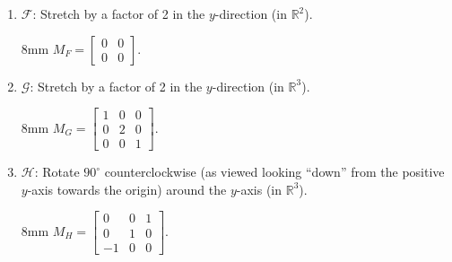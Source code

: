 \documentclass[letter]{article}
\newcommand{\R}{\mathbb{R}}
\newcommand{\mat}[1]{\begin{bmatrix}#1\end{bmatrix}}
\newenvironment{answer}{
	\begin{adjustwidth}{8mm}{} \vspace{2mm}}{\end{adjustwidth} \vspace{2mm}
}
\theoremstyle{plain}
\theoremstyle{definition}
\theoremstyle{remark}
\begin{document}
\begin{enumerate}
\begin{enumerate}
\begin{answer}
			\end{answer}
			\item $\mathcal{F}$: Stretch by a factor of 2 in the $y$-direction (in $\R^2$).
			\begin{answer}
				$\displaystyle M_F = \mat{0&0\\0&0}$.
			\end{answer}
			\item $\mathcal{G}$: Stretch by a factor of 2 in the $y$-direction (in $\R^3$).
			\begin{answer}
				$\displaystyle M_G = \mat{1&0&0\\0&2&0\\0&0&1}$.
			\end{answer}
			\item $\mathcal{H}$: Rotate $90^\circ$ counterclockwise (as viewed looking ``down'' from the positive $y$-axis towards the origin) around the $y$-axis (in $\R^3$).
			\begin{answer}
				$\displaystyle M_H = \mat{0&0&1\\0&1&0\\-1&0&0}$.
			\end{answer}
		\end{enumerate}
		

\end{enumerate}
\end{document}
